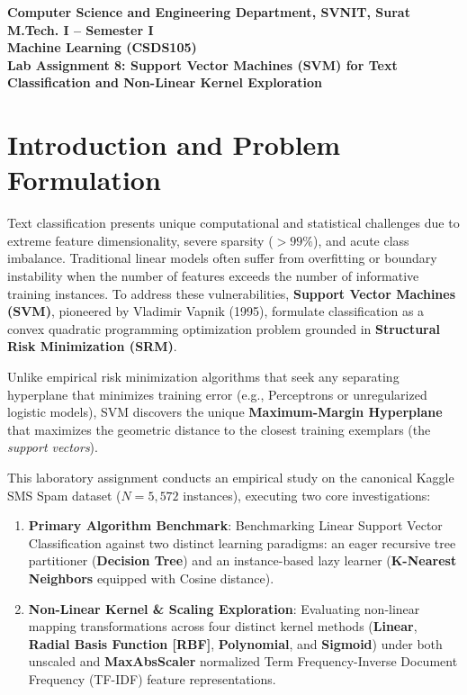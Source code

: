 \documentclass[12pt]{article}
\begin{document}

\begin{center}
\textbf{Computer Science and Engineering Department, SVNIT, Surat}\\
\textbf{M.Tech. I -- Semester I}\\
\textbf{Machine Learning (CSDS105)}\\
\textbf{Lab Assignment 8: Support Vector Machines (SVM) for Text Classification and Non-Linear Kernel Exploration}
\end{center}

\vspace{0.3cm}

\section{Introduction and Problem Formulation}

Text classification presents unique computational and statistical challenges due to extreme feature dimensionality, severe sparsity ($>99\%$), and acute class imbalance. Traditional linear models often suffer from overfitting or boundary instability when the number of features exceeds the number of informative training instances. To address these vulnerabilities, \textbf{Support Vector Machines (SVM)}, pioneered by Vladimir Vapnik (1995), formulate classification as a convex quadratic programming optimization problem grounded in \textbf{Structural Risk Minimization (SRM)}.

Unlike empirical risk minimization algorithms that seek any separating hyperplane that minimizes training error (e.g., Perceptrons or unregularized logistic models), SVM discovers the unique \textbf{Maximum-Margin Hyperplane} that maximizes the geometric distance to the closest training exemplars (the \textit{support vectors}). 

This laboratory assignment conducts an empirical study on the canonical Kaggle SMS Spam dataset ($N=5,572$ instances), executing two core investigations:
\begin{enumerate}
    \item \textbf{Primary Algorithm Benchmark}: Benchmarking Linear Support Vector Classification against two distinct learning paradigms: an eager recursive tree partitioner (\textbf{Decision Tree}) and an instance-based lazy learner (\textbf{K-Nearest Neighbors} equipped with Cosine distance).
    \item \textbf{Non-Linear Kernel & Scaling Exploration}: Evaluating non-linear mapping transformations across four distinct kernel methods (\textbf{Linear}, \textbf{Radial Basis Function [RBF]}, \textbf{Polynomial}, and \textbf{Sigmoid}) under both unscaled and \textbf{MaxAbsScaler} normalized Term Frequency-Inverse Document Frequency (TF-IDF) feature representations.
\end{enumerate}
\end{document}

